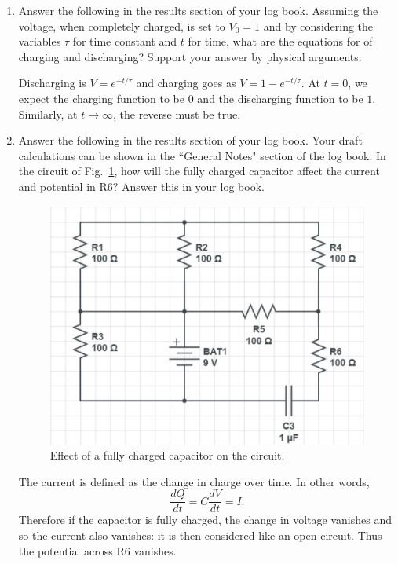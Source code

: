 \documentclass[12pt]{report}
\begin{document}
\begin{enumerate}
\item {\color{blue}Answer the following in the results section of your log book. }
Assuming the voltage, when completely charged, is set to $V_0 = 1$ and by considering the variables $\tau$ for time constant and $t$ for time, what are the equations for of charging and discharging? 
Support your answer by physical arguments.

\begin{tcolorbox}[title=Answer]
Discharging is $V = e^{-t/\tau}$ and charging goes as $V=1-e^{-t/\tau}$. At $t=0$, we expect the charging function to be $0$ and the discharging function to be $1$. Similarly, at $t\rightarrow \infty$, the reverse must be true.
\end{tcolorbox}

\item {\color{blue}Answer the following in the results section of your log book.} Your draft calculations can be shown in the ``General Notes" section of the log book. 
In the circuit of Fig.~\ref{Fig:lab2-session1-Rpractice}, how will the fully charged capacitor affect the current and potential in R6? Answer this in your log book.
\begin{figure}[h]
\centering
\includegraphics[width=0.6\linewidth]{lab2-session1-Rpractice}
\caption{Effect of a fully charged capacitor on the circuit.}
\label{Fig:lab2-session1-Rpractice}
\end{figure}

\begin{tcolorbox}[title=Answer]
The current is defined as the change in charge over time. In other words,
\begin{equation}
\frac{dQ}{dt} = C \frac{dV}{dt} = I.
\end{equation}
Therefore if the capacitor is fully charged, the change in voltage vanishes and so the current also vanishes: it is then considered like an open-circuit. Thus the potential across R6 vanishes.
\end{tcolorbox}


\end{enumerate}
\end{document}
